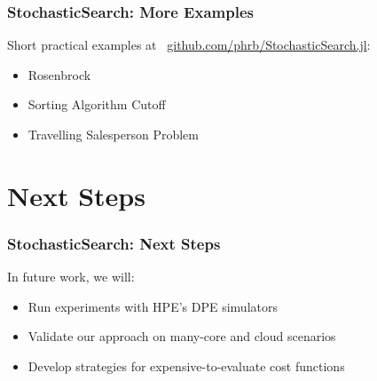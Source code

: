 \documentclass[10pt, compress, aspectratio=169, xcolor=table]{beamer}
\begin{document}
\begin{frame}
    \frametitle{StochasticSearch: More Examples}
    Short \alert{practical examples} at $\,$ \url{github.com/phrb/StochasticSearch.jl}:

    \begin{itemize}
        \item Rosenbrock
        \item Sorting Algorithm Cutoff
        \item Travelling Salesperson Problem
    \end{itemize}
\end{frame}

\section*{Next Steps}

\begin{frame}
    \frametitle{StochasticSearch: Next Steps}
    In \alert{future work}, we will:

    \begin{itemize}
        \item Run experiments with HPE's \alert{DPE simulators}
        \item Validate our approach on \alert{many-core and cloud scenarios}
        \item Develop strategies for \alert{expensive-to-evaluate cost functions}
    \end{itemize}
\end{frame}

\maketitle
\end{document}
